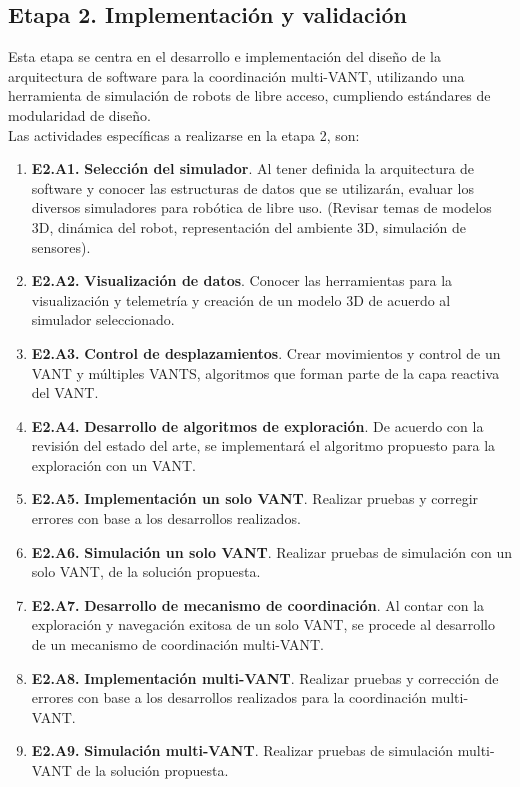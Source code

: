 \documentclass[sigconf]{acmart}
\begin{document}
  \subsection*{Etapa 2. Implementaci\'{o}n y validaci\'{o}n}
  
  Esta etapa se centra en el desarrollo e implementaci\'{o}n del dise\~{n}o de la arquitectura de software para la coordinaci\'{o}n multi-VANT, utilizando una herramienta de simulación de robots de libre acceso, cumpliendo estándares de modularidad de diseño.\\
  
  Las actividades espec\'{i}ficas a realizarse en la etapa 2, son:

  \begin{enumerate}
  \item[] \textbf{E2.A1.} \textbf{Selecci\'{o}n del simulador}. Al tener definida la arquitectura de software y conocer las estructuras de datos que se utilizarán, evaluar los diversos simuladores para rob\'{o}tica de libre uso. (Revisar temas de modelos 3D, din\'{a}mica del robot, representaci\'{o}n del ambiente 3D, simulaci\'{o}n de sensores). 
  \item[] \textbf{E2.A2.} \textbf{Visualizaci\'{o}n de datos}. Conocer las herramientas para la visualizaci\'{o}n y telemetr\'{i}a y creaci\'{o}n de un modelo 3D de acuerdo al simulador seleccionado.
  \item[] \textbf{E2.A3.} \textbf{Control de desplazamientos}. Crear movimientos y control de un VANT y m\'{u}ltiples VANTS, algoritmos que forman parte de la capa reactiva del VANT.
  \item[] \textbf{E2.A4.} \textbf{Desarrollo de algoritmos de exploraci\'{o}n}. De acuerdo con la revisi\'{o}n del estado del arte, se implementar\'{a} el algoritmo propuesto para la exploraci\'{o}n con un VANT.
  \item[] \textbf{E2.A5.} \textbf{Implementaci\'{o}n un solo VANT}. Realizar pruebas y corregir errores con base a los desarrollos realizados.
  \item[] \textbf{E2.A6.} \textbf{Simulaci\'{o}n un solo VANT}. Realizar pruebas de simulaci\'{o}n con un solo VANT, de la soluci\'{o}n propuesta.
  \item[] \textbf{E2.A7.} \textbf{Desarrollo de mecanismo de coordinaci\'{o}n}. Al contar con la exploraci\'{o}n y navegaci\'{o}n exitosa de un solo VANT, se procede al desarrollo de un mecanismo de coordinaci\'{o}n multi-VANT.
  \item[] \textbf{E2.A8.} \textbf{Implementaci\'{o}n multi-VANT}. Realizar pruebas y correcci\'{o}n de errores con base a los desarrollos realizados para la coordinaci\'{o}n multi-VANT.
  \item[] \textbf{E2.A9.} \textbf{Simulaci\'{o}n multi-VANT}. Realizar pruebas de simulaci\'{o}n multi-VANT de la soluci\'{o}n propuesta.
  \end{enumerate}
  
\end{document}
